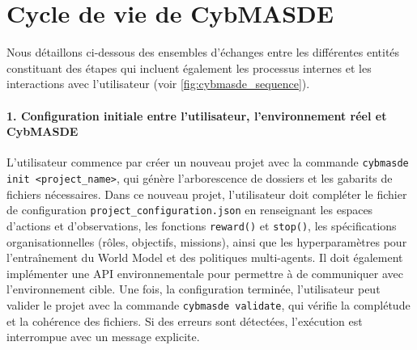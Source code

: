 \section{Cycle de vie de CybMASDE}

Nous détaillons ci-dessous des ensembles d'échanges entre les différentes entités constituant des étapes qui incluent également les processus internes et les interactions avec l'utilisateur (voir \autoref{fig:cybmasde_sequence}).

\paragraph{1. Configuration initiale entre l'utilisateur, l'environnement réel et CybMASDE}

L'utilisateur commence par créer un nouveau projet avec la commande \texttt{cybmasde init <project\_name>}, qui génère l'arborescence de dossiers et les gabarits de fichiers nécessaires. Dans ce nouveau projet, l'utilisateur doit compléter le fichier de configuration \texttt{project\_configuration.json} en renseignant les espaces d'actions et d'observations, les fonctions \texttt{reward()} et \texttt{stop()}, les spécifications organisationnelles (rôles, objectifs, missions), ainsi que les hyperparamètres pour l'entraînement du World Model et des politiques multi-agents. Il doit également implémenter une API environnementale pour permettre à  de communiquer avec l'environnement cible. Une fois, la configuration terminée, l'utilisateur peut valider le projet avec la commande \texttt{cybmasde validate}, qui vérifie la complétude et la cohérence des fichiers. Si des erreurs sont détectées, l'exécution est interrompue avec un message explicite.

